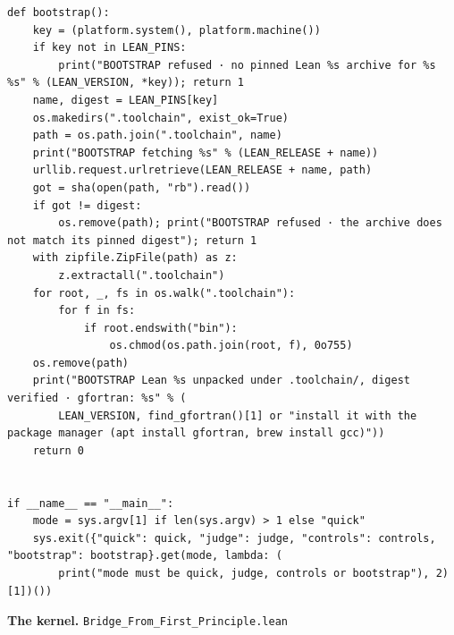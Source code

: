 \documentclass[10pt,twocolumn]{article}
\begin{document}
\begin{Verbatim}
def bootstrap():
    key = (platform.system(), platform.machine())
    if key not in LEAN_PINS:
        print("BOOTSTRAP refused · no pinned Lean %s archive for %s %s" % (LEAN_VERSION, *key)); return 1
    name, digest = LEAN_PINS[key]
    os.makedirs(".toolchain", exist_ok=True)
    path = os.path.join(".toolchain", name)
    print("BOOTSTRAP fetching %s" % (LEAN_RELEASE + name))
    urllib.request.urlretrieve(LEAN_RELEASE + name, path)
    got = sha(open(path, "rb").read())
    if got != digest:
        os.remove(path); print("BOOTSTRAP refused · the archive does not match its pinned digest"); return 1
    with zipfile.ZipFile(path) as z:
        z.extractall(".toolchain")
    for root, _, fs in os.walk(".toolchain"):
        for f in fs:
            if root.endswith("bin"):
                os.chmod(os.path.join(root, f), 0o755)
    os.remove(path)
    print("BOOTSTRAP Lean %s unpacked under .toolchain/, digest verified · gfortran: %s" % (
        LEAN_VERSION, find_gfortran()[1] or "install it with the package manager (apt install gfortran, brew install gcc)"))
    return 0


if __name__ == "__main__":
    mode = sys.argv[1] if len(sys.argv) > 1 else "quick"
    sys.exit({"quick": quick, "judge": judge, "controls": controls, "bootstrap": bootstrap}.get(mode, lambda: (
        print("mode must be quick, judge, controls or bootstrap"), 2)[1])())
\end{Verbatim}

\textbf{The kernel.} \texttt{Bridge\_\allowbreak{}From\_\allowbreak{}First\_\allowbreak{}Principle.lean}
\end{document}
